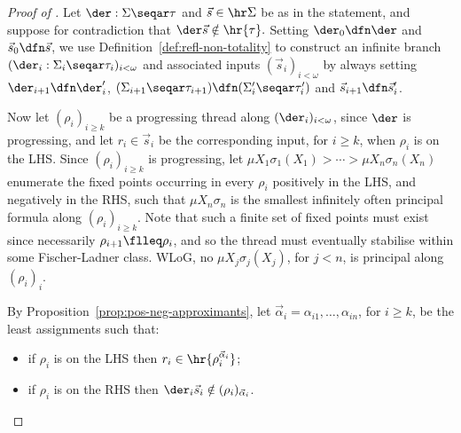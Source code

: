 \begin{proof}
[Proof of ]
    Let $\der : \Sigma\seqar \tau$ and $\vec s \in \hr\Sigma$ be as in the statement, and suppose for contradiction that $\der\vec s \notin \hr{ \tau}.$
Setting $\der_0 \dfn \der$ and $\vec s_0 \dfn \vec s$, we use Definition~\ref{def:refl-non-totality} to construct an infinite branch $(\der_i : \Sigma_i \seqar \tau_i)_{i < \omega}$ and associated inputs $(\vec s_i)_{i < \omega}$ by always setting $\der_{i+1} \dfn \der_i'$, $(\Sigma_{i+1}\seqar \tau_{i+1}) \dfn (\Sigma_i'\seqar \tau_i')$ and $\vec s_{i+1}\dfn \vec s_i'$.

Now let $(\rho_i)_{i\geq k}$ be a progressing thread along $(\der_i)_{i <\omega}$, since $\der$ is progressing, and let $r_i \in \vec s_i$ be the corresponding input, for $i\geq k$, when $\rho_i$ is on the LHS.
% 
% 
Since $(\rho_i)_{i\geq k}$ is progressing, let $\mu X_1\sigma_1(X_1) > \cdots > \mu X_n \sigma_n (X_n)$ enumerate the fixed points occurring in every $\rho_i$ positively in the LHS, and negatively in the RHS, such that $\mu X_n\sigma_n$ is the smallest infinitely often principal formula along $(\rho_i)_{i\geq k}$. 
Note that such a finite set of fixed points must exist since 
necessarily $\rho_{i+1}\flleq \rho_{i}$, and so the thread must eventually stabilise within some Fischer-Ladner class. 
WLoG, no $\mu X_j \sigma_j (X_j)$, for $j<n$, is principal along $(\rho_i)_i$.

By Proposition~\ref{prop:pos-neg-approximants}, let $\vec \alpha_i = \alpha_{i1}, \dots, \alpha_{in}$, for $i \geq k$, be the least assignments such that:
\begin{itemize}
    \item if $\rho_i$ is on the LHS then $r_i \in \hr{\rho_i^{\vec \alpha_i}}$; 
    \item if $\rho_i$ is on the RHS then $\der_i\vec s_i \notin (\rho_i)_{\vec \alpha_i}$. 
\end{itemize}


\end{proof}

